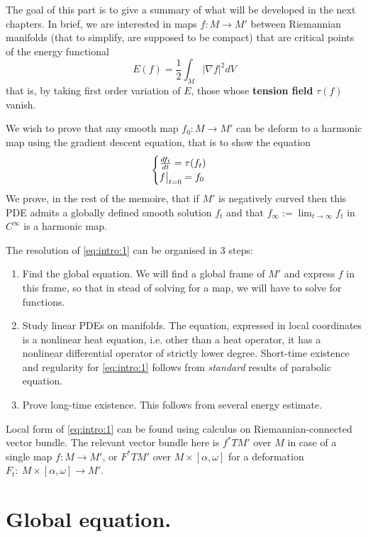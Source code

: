 
The goal of this part is to give a summary of what will be developed in the next chapters. In brief, we are interested in
maps \(f: M \longrightarrow M'\) between Riemannian manifolds (that to simplify, are
supposed to be compact) that are critical points of the energy functional
\[
 E(f) = \frac{1}{2}\int_M |\nabla f|^2 dV
\]
that is, by taking first order variation of \(E\), those whose \textbf{tension field} \(\tau(f)\) vanish. 

We wish to prove that any smooth map \(f_0: M \longrightarrow M'\) can be deform to a
harmonic map using the gradient descent equation, that is to show the equation
\begin{equation}
\label{eq:intro:1}
\begin{cases}
\frac{df_t}{dt} = \tau(f_t)\\
\restr{f}{t=0} = f_0
\end{cases}
\end{equation}
We prove, in the rest of the memoire, that if \(M'\) is negatively curved then this PDE admits a globally defined smooth
solution \(f_t\) and that \(f_{\infty}:=\lim_{t\to \infty} f_t\) in \(C^\infty\) is
a harmonic map.

The resolution of \eqref{eq:intro:1} can be organised in 3 steps:
\begin{enumerate}
\item Find the global equation. We will find a global frame of \(M'\) and express
\(f\) in this frame, so that in stead of solving for a map, we will have to solve for functions.
\item Study linear PDEs on manifolds. The equation, expressed in local coordinates is a nonlinear heat equation, i.e. other
than a heat operator, it has a nonlinear differential operator of strictly lower
degree. Short-time existence and regularity for \eqref{eq:intro:1} follows from \emph{standard} results of
parabolic equation.
\item Prove long-time existence. This follows from several energy estimate.
\end{enumerate}

Local form of \eqref{eq:intro:1} can be found using calculus on Riemannian-connected vector
bundle. The relevant vector bundle here is \(f^* TM'\) over \(M\) in case of a single
map \(f: M \longrightarrow M'\), or \(F^* TM'\) over \(M\times[\alpha,\omega]\) for
a deformation \(F_t:\ M\times [\alpha,\omega] \longrightarrow M'\).

\section{Global equation.}
\label{sec:orgbbc11fd}

